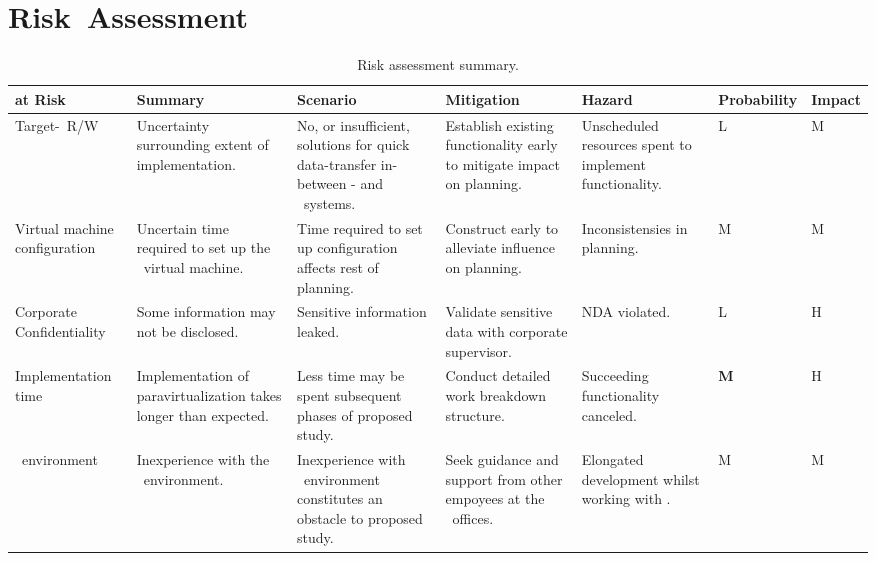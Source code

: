 \section{Risk~Assessment}
\label{sec:risksandliabilities_riskassessment}
\begin{sidewaystable}[h]
\begin{tabular*}{0.75\textwidth}{p{2.8cm}|p{2.8cm}|p{2.8cm}|p{2.8cm}|p{2.8cm}|p{2.2cm}|p{2.2cm}} %
	\textbf{at Risk}				& \textbf{Summary}														& \textbf{Scenario}                   																		& \textbf{Mitigation}        												& \textbf{Hazard}												& \textbf{Probability}	& \textbf{Impact}	\\ \hline
	Target-\termhost\ R/W			& Uncertainty surrounding extent of implementation. 					& No, or insufficient, solutions for quick data-transfer in-between \termhost - and \termtarget\ systems.	& Establish existing functionality early to mitigate impact on planning.	& Unscheduled resources spent to implement functionality.		& L 					& M					\\ \hline
	Virtual machine configuration	& Uncertain time required to set up the \termandroid\ virtual machine. 	& Time required to set up configuration affects rest of planning.											& Construct early to alleviate influence on planning.						& Inconsistensies in planning.									& M 					& M					\\ \hline
	Corporate Confidentiality		& Some information may not be disclosed.								& Sensitive information leaked.																				& Validate sensitive data with corporate supervisor.						& NDA violated. 												& L 					& H					\\ \hline
	Implementation time				& Implementation of paravirtualization takes longer than expected.		& Less time may be spent subsequent phases of proposed study.																& Conduct detailed work breakdown structure.				& Succeeding functionality canceled.	& \textbf{M}			& H					\\ \hline
	\termsimics\ environment		& Inexperience with the \termsimics\ environment.						& Inexperience with \termsimics\ environment constitutes an obstacle to proposed study.						& Seek guidance and support from other empoyees at the \termintel\ offices. & Elongated development whilst working with \termsimics .		& M						& M					
\end{tabular*}
\label{tab:risks}
\caption{Risk assessment summary.}
\end{sidewaystable}
